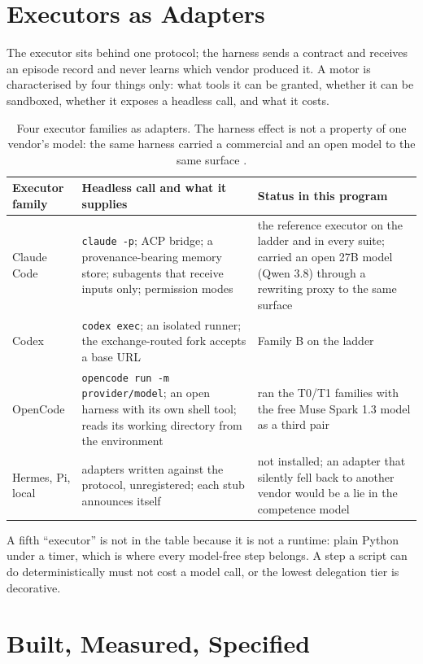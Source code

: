 \section{Executors as Adapters}\label{sec:motors}

The executor sits behind one protocol; the harness sends a contract and receives an episode record and never learns which vendor produced it. A motor is characterised by four things only: what tools it can be granted, whether it can be sandboxed, whether it exposes a headless call, and what it costs.

\begin{table}[!htbp]
\centering\small
\begin{tabularx}{\textwidth}{@{}lYY@{}}
\toprule
Executor family & Headless call and what it supplies & Status in this program \\
\midrule
Claude Code & \texttt{claude -p}; ACP bridge; a provenance-bearing memory store; subagents that receive inputs only; permission modes & the reference executor on the ladder and in every suite; carried an open 27B model (Qwen 3.8) through a rewriting proxy to the same surface \\
Codex & \texttt{codex exec}; an isolated runner; the exchange-routed fork accepts a base URL & Family B on the ladder \\
OpenCode & \texttt{opencode run -m provider/model}; an open harness with its own shell tool; reads its working directory from the environment & ran the T0/T1 families with the free Muse Spark 1.3 model as a third pair \\
Hermes, Pi, local & adapters written against the protocol, unregistered; each stub announces itself & not installed; an adapter that silently fell back to another vendor would be a lie in the competence model \\
\bottomrule
\end{tabularx}
\caption{Four executor families as adapters. The harness effect is not a property of one vendor's model: the same harness carried a commercial and an open model to the same surface \citep{yang2026scaling}.}
\label{tab:motors}
\end{table}

A fifth ``executor'' is not in the table because it is not a runtime: plain Python under a timer, which is where every model-free step belongs. A step a script can do deterministically must not cost a model call, or the lowest delegation tier is decorative.

\section{Built, Measured, Specified}\label{sec:status}

